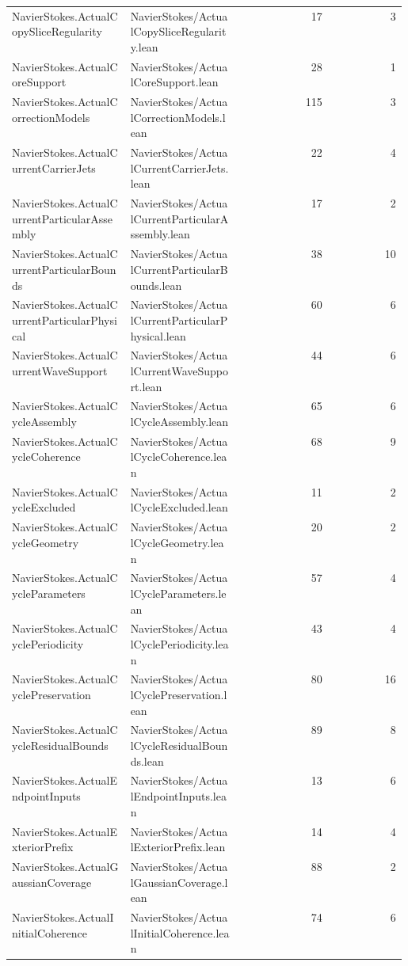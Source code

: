 \begin{longtable}{p{0.30\linewidth}p{0.28\linewidth}rr}
NavierStokes.ActualCopySliceRegularity & NavierStokes/ActualCopySliceRegularity.lean & 17 & 3\\
NavierStokes.ActualCoreSupport & NavierStokes/ActualCoreSupport.lean & 28 & 1\\
NavierStokes.ActualCorrectionModels & NavierStokes/ActualCorrectionModels.lean & 115 & 3\\
NavierStokes.ActualCurrentCarrierJets & NavierStokes/ActualCurrentCarrierJets.lean & 22 & 4\\
NavierStokes.ActualCurrentParticularAssembly & NavierStokes/ActualCurrentParticularAssembly.lean & 17 & 2\\
NavierStokes.ActualCurrentParticularBounds & NavierStokes/ActualCurrentParticularBounds.lean & 38 & 10\\
NavierStokes.ActualCurrentParticularPhysical & NavierStokes/ActualCurrentParticularPhysical.lean & 60 & 6\\
NavierStokes.ActualCurrentWaveSupport & NavierStokes/ActualCurrentWaveSupport.lean & 44 & 6\\
NavierStokes.ActualCycleAssembly & NavierStokes/ActualCycleAssembly.lean & 65 & 6\\
NavierStokes.ActualCycleCoherence & NavierStokes/ActualCycleCoherence.lean & 68 & 9\\
NavierStokes.ActualCycleExcluded & NavierStokes/ActualCycleExcluded.lean & 11 & 2\\
NavierStokes.ActualCycleGeometry & NavierStokes/ActualCycleGeometry.lean & 20 & 2\\
NavierStokes.ActualCycleParameters & NavierStokes/ActualCycleParameters.lean & 57 & 4\\
NavierStokes.ActualCyclePeriodicity & NavierStokes/ActualCyclePeriodicity.lean & 43 & 4\\
NavierStokes.ActualCyclePreservation & NavierStokes/ActualCyclePreservation.lean & 80 & 16\\
NavierStokes.ActualCycleResidualBounds & NavierStokes/ActualCycleResidualBounds.lean & 89 & 8\\
NavierStokes.ActualEndpointInputs & NavierStokes/ActualEndpointInputs.lean & 13 & 6\\
NavierStokes.ActualExteriorPrefix & NavierStokes/ActualExteriorPrefix.lean & 14 & 4\\
NavierStokes.ActualGaussianCoverage & NavierStokes/ActualGaussianCoverage.lean & 88 & 2\\
NavierStokes.ActualInitialCoherence & NavierStokes/ActualInitialCoherence.lean & 74 & 6\\

\end{longtable}
